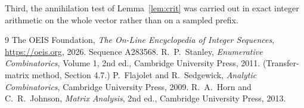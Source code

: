 \documentclass[11pt,a4paper]{article}
\theoremstyle{plain}
\theoremstyle{definition}
\begin{document}
Third, the annihilation test of Lemma~\ref{lem:crit} was carried out in exact integer
arithmetic on the whole vector rather than on a sampled prefix.

\begin{thebibliography}{9}
 The OEIS Foundation, \emph{The On-Line Encyclopedia of Integer
Sequences}, \url{https://oeis.org}, 2026. Sequence A283568.
 R.~P.~Stanley, \emph{Enumerative Combinatorics}, Volume 1, 2nd ed.,
Cambridge University Press, 2011. (Transfer-matrix method, Section 4.7.)
 P.~Flajolet and R.~Sedgewick, \emph{Analytic Combinatorics}, Cambridge
University Press, 2009.
 R.~A.~Horn and C.~R.~Johnson, \emph{Matrix Analysis}, 2nd ed., Cambridge
University Press, 2013.
\end{thebibliography}
\end{document}
